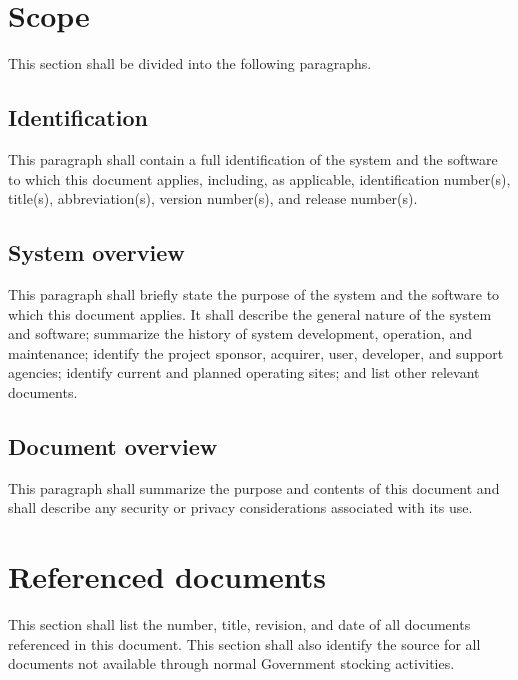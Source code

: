 \documentclass{fidata-report-template}
\begin{document}
\section{Scope}

This section shall be divided into the following paragraphs.

\subsection{Identification}

This paragraph shall contain a full identification of the system and the
software to which this document applies, including, as applicable,
identification number(s), title(s), abbreviation(s), version number(s),
and release number(s).

\subsection{System overview}

This paragraph shall briefly state the purpose of the system and the
software to which this document applies. It shall describe the general
nature of the system and software; summarize the history of system
development, operation, and maintenance; identify the project sponsor,
acquirer, user, developer, and support agencies; identify current and
planned operating sites; and list other relevant documents.

\subsection{Document overview}

This paragraph shall summarize the purpose and contents of this document
and shall describe any security or privacy considerations associated
with its use.

\section{}

\section{Referenced documents}

This section shall list the number, title, revision, and date of all
documents referenced in this document. This section shall also identify
the source for all documents not available through normal Government
stocking activities.
\end{document}
